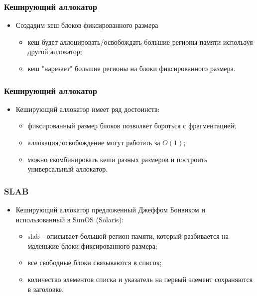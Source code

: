 \begin{frame}
\frametitle{Кеширующий аллокатор}
\begin{itemize}
    \item<1->Создадим кеш блоков фиксированного размера
    \begin{itemize}
        \item<2->кеш будет аллоцировать/освобождать большие регионы памяти
        используя другой аллокатор;
        \item<3->кеш "нарезает" большие регионы на блоки фиксированного размера.
    \end{itemize}
\end{itemize}
\end{frame}

\begin{frame}
\frametitle{Кеширующий аллокатор}
\begin{itemize}
    \item<1->Кеширующий аллокатор имеет ряд достоинств:
    \begin{itemize}
        \item<2->фиксированный размер блоков позволяет бороться с фрагментацией;
        \item<3->аллокация/освобождение могут работать за $O\left(1\right)$;
        \item<4->можно скомбинировать кеши разных размеров и построить
        универсальный аллокатор.
    \end{itemize}
\end{itemize}
\end{frame}

\begin{frame}
\frametitle{SLAB}
\begin{itemize}
    \item<1->Кеширующий аллокатор предложенный Джеффом Бонвиком и
    использованный в SunOS (Solaris):
    \begin{itemize}
        \item<2->slab - описывает большой регион памяти, который разбивается на
        маленькие блоки фиксированного размера;
        \item<3->все свободные блоки связываются в список;
        \item<3->количество элементов списка и указатель на первый элемент
        сохраняются в заголовке.
    \end{itemize}
\end{itemize}
\end{frame}

